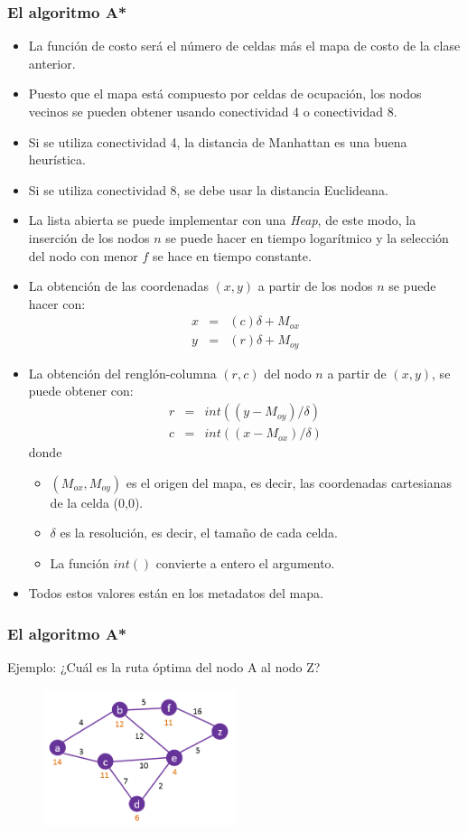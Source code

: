 \documentclass[10pt,spanish,aspectratio=1610]{beamer}
\begin{document}
\begin{frame}\frametitle{El algoritmo A*}
  \begin{itemize}
  \item La función de costo será el número de celdas más el mapa de costo de la clase anterior.
  \item Puesto que el mapa está compuesto por celdas de ocupación, los nodos vecinos se pueden obtener usando conectividad 4 o conectividad 8.
  \item Si se utiliza conectividad 4, la distancia de Manhattan es una buena heurística.
  \item Si se utiliza conectividad 8, se debe usar la distancia Euclideana.
  \item La lista abierta se puede implementar con una \textit{Heap}, de este modo, la inserción de los nodos $n$ se puede hacer en tiempo logarítmico y la selección del nodo con menor $f$ se hace en tiempo constante.
  \item La obtención de las coordenadas $(x,y)$ a partir de los nodos $n$ se puede hacer con:
    \begin{eqnarray*}
      x &=& (c)\delta + M_{ox}\\
      y &=& (r)\delta + M_{oy}
    \end{eqnarray*}
  \item La obtención del renglón-columna $(r,c)$ del nodo $n$ a partir de $(x,y)$, se puede obtener con:
    \begin{eqnarray*}
      r &=& int((y - M_{oy})/\delta)\\
      c &=& int((x - M_{ox})/\delta)
    \end{eqnarray*}
    donde
    \begin{itemize}
    \item $(M_{ox}, M_{oy})$ es el origen del mapa, es decir, las coordenadas cartesianas de la celda (0,0).
    \item $\delta$ es la resolución, es decir, el tamaño de cada celda.
    \item La función $int()$ convierte a entero el argumento. 
    \end{itemize}
    \item Todos estos valores están en los metadatos del mapa. 
  \end{itemize}
\end{frame}

\begin{frame}\frametitle{El algoritmo A*}
  Ejemplo: ¿Cuál es la ruta óptima del nodo A al nodo Z?
  \begin{figure}
    \centering
    \includegraphics[width=0.5\textwidth]{Figures/AStarExample.png}
  \end{figure}
\end{frame}
\end{document}
